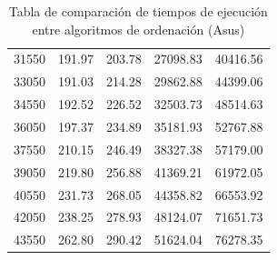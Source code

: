\documentclass{homework}
\begin{document}
\begin{table}[H]
\begin{tabular}{|r|r|r|r|r|}
            31550 & 191.97 & 203.78 & 27098.83 & 40416.56 \\ 
            33050 & 191.03 & 214.28 & 29862.88 & 44399.06 \\ 
            34550 & 192.52 & 226.52 & 32503.73 & 48514.63 \\ 
            36050 & 197.37 & 234.89 & 35181.93 & 52767.88 \\ 
            37550 & 210.15 & 246.49 & 38327.38 & 57179.00 \\ 
            39050 & 219.80 & 256.88 & 41369.21 & 61972.05 \\ 
            40550 & 231.73 & 268.05 & 44358.82 & 66553.92 \\ 
            42050 & 238.25 & 278.93 & 48124.07 & 71651.73 \\ 
            43550 & 262.80 & 290.42 & 51624.04 & 76278.35 \\ 
            \hline
        \end{tabular}
        \caption{Tabla de comparación de tiempos de ejecución entre algoritmos de ordenación (Asus)}
    \end{table}
\end{document}
